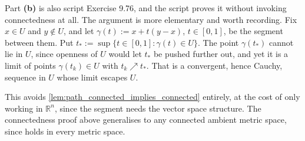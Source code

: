 \begin{remark}
Part \textbf{(b)} is also script Exercise 9.76, and the script proves it without invoking
connectedness at all. The argument is more elementary and worth recording. Fix $x \in U$ and
$y \notin U$, and let $\gamma(t) := x+t(y-x)$, $t\in[0,1]$, be the segment between them. Put
$t_* := \sup\{t\in[0,1] : \gamma(t)\in U\}$. The point $\gamma(t_*)$ cannot lie in $U$, since
openness of $U$ would let $t_*$ be pushed further out, and yet it is a limit of points
$\gamma(t_k) \in U$ with $t_k \nearrow t_*$. That is a convergent, hence Cauchy, sequence in $U$
whose limit escapes $U$.

This avoids \cref{lem:path_connected_implies_connected} entirely, at the cost of only working in
$\mathbb{R}^n$, since the segment needs the vector space structure. The connectedness proof above
generalises to any connected ambient metric space, since  holds
in every metric space.
\end{remark}

